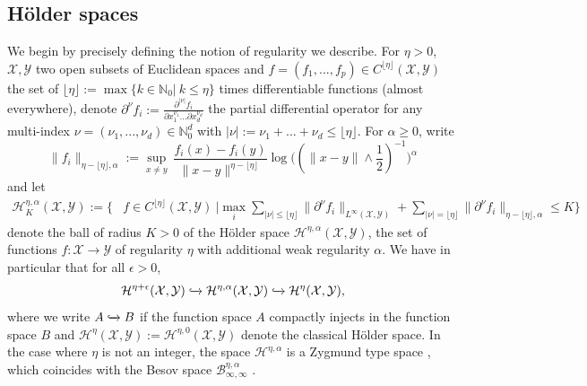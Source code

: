 \documentclass{article}
\begin{document}
\subsection{Hölder spaces}
We begin by precisely defining the notion of regularity we describe. For $\eta >0$, $\mathcal{X},\mathcal{Y}$ two open subsets of Euclidean spaces and $f=(f_1,...,f_p)\in C^{\lfloor \eta \rfloor}(\mathcal{X},\mathcal{Y})$ the set of $\lfloor \eta \rfloor:=\max \{k\in \mathbb{N}_0 |\ k\leq \eta\}$  times differentiable functions (almost everywhere), denote $\partial^\nu f_i := \frac{\partial^{|\nu|}f_i}{\partial x_1^{\nu_1}...\partial x_d^{\nu_d}}$ the partial differential operator  for any multi-index $\nu = (\nu_1,...,\nu_d)\in \mathbb{N}_0^d$ with $|\nu|:=\nu_1+...+\nu_d\leq \lfloor \eta \rfloor$. For $\alpha\geq 0$, write 
$$
\|f_i\|_{\eta-\lfloor \eta \rfloor,\alpha}:=\sup \limits_{x\neq y}\ \frac{f_i(x)-f_i(y)}{\|x-y\|^{\eta - \lfloor \eta \rfloor}} \log\big((\|x-y\|\wedge\frac{1}{2})^{-1}\big)^{\alpha}
$$
and let 
\begin{align*}
\mathcal{H}^{\eta,\alpha}_K(\mathcal{X},\mathcal{Y}):=\Big\{& f  \in C^{\lfloor \eta \rfloor}(\mathcal{X},\mathcal{Y}) \ \big| \max \limits_{i} \sum \limits_{|\nu|\leq \lfloor \eta \rfloor} \|\partial^\nu f_i\|_{L^\infty(\mathcal{X},\mathcal{Y})} + \sum \limits_{|\nu|  = \lfloor \eta \rfloor} \|\partial^\nu f_i\|_{\eta-\lfloor \eta \rfloor,\alpha}   \leq K\Big\}
\end{align*}
denote the ball of radius $K>0$ of the Hölder space $\mathcal{H}^{\eta,\alpha}(\mathcal{X},\mathcal{Y})$, the set of functions $f:\mathcal{X}\rightarrow \mathcal{Y}$ of regularity $\eta$ with additional weak regularity $\alpha$. We have in particular that for all $\epsilon>0$,
$$\mathcal{H}^{\eta+\epsilon}(\mathcal{X},\mathcal{Y})\xhookrightarrow{} \mathcal{H}^{\eta,\alpha}(\mathcal{X},\mathcal{Y}) \xhookrightarrow{} \mathcal{H}^{\eta}(\mathcal{X},\mathcal{Y}),$$
where we write $A\xhookrightarrow{} B$ if the function space $A$ compactly injects in the function space $B$ and $\mathcal{H}^{\eta}(\mathcal{X},\mathcal{Y}):=\mathcal{H}^{\eta,0}(\mathcal{X},\mathcal{Y})$ denote the classical Hölder space. In the case where $\eta$ is not an integer, the space $\mathcal{H}^{\eta,\alpha}$ is a Zygmund type space \citep{Haroske2000}, which coincides with the Besov space $\mathcal{B}^{\eta,\alpha}_{\infty,\infty}$ \citep{haroske2006envelopes}.
\end{document}
